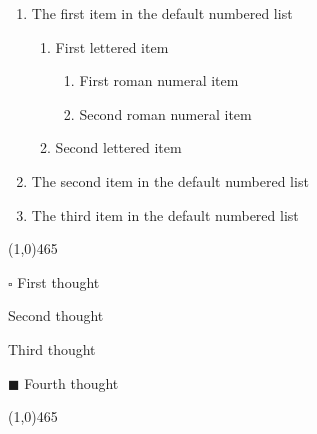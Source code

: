 \documentclass[12pt]{article}
\newenvironment{tightcenter}{%
  \setlength\topsep{0pt}
  \setlength\parskip{0pt}
  \begin{center}
}{%
  \end{center}
}
\begin{document}
\begin{enumerate}
\item The first item in the default numbered list

\begin{enumerate}[label=(\alph*)]
\item First lettered item
\begin{enumerate}[label=\roman*.]
\item First roman numeral item
\item Second roman numeral item
\end{enumerate}
\item Second lettered item
\end{enumerate}

\item The second item in the default numbered list
\item The third item in the default numbered list
\end{enumerate}

\begin{tightcenter}
\line(1,0){465}
\end{tightcenter}


\begin{itemize}
\begin{multicols}{2}
\item[$\square$] First thought
\item Second thought
\item Third thought
\item[$\blacksquare$] Fourth thought
\end{multicols}
\end{itemize}

\begin{tightcenter}
\line(1,0){465}
\end{tightcenter}
\end{document}
